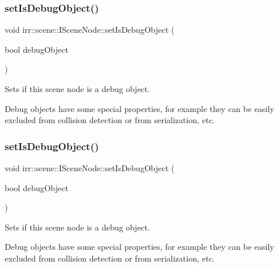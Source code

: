 \subsubsection{\texorpdfstring{set\+Is\+Debug\+Object()}{setIsDebugObject()}\hspace{0.1cm}{\footnotesize\ttfamily [1/2]}}
{\footnotesize\ttfamily void irr\+::scene\+::\+I\+Scene\+Node\+::set\+Is\+Debug\+Object (\begin{DoxyParamCaption}\item[{bool}]{debug\+Object }\end{DoxyParamCaption})\hspace{0.3cm}{\ttfamily [inline]}}



Sets if this scene node is a debug object. 

Debug objects have some special properties, for example they can be easily excluded from collision detection or from serialization, etc. \mbox{\label{classirr_1_1scene_1_1ISceneNode_a7ceda3eb747a353ffeda02c26e697cbd}} 
\subsubsection{\texorpdfstring{set\+Is\+Debug\+Object()}{setIsDebugObject()}\hspace{0.1cm}{\footnotesize\ttfamily [2/2]}}
{\footnotesize\ttfamily void irr\+::scene\+::\+I\+Scene\+Node\+::set\+Is\+Debug\+Object (\begin{DoxyParamCaption}\item[{bool}]{debug\+Object }\end{DoxyParamCaption})\hspace{0.3cm}{\ttfamily [inline]}}



Sets if this scene node is a debug object. 

Debug objects have some special properties, for example they can be easily excluded from collision detection or from serialization, etc. \mbox{\label{classirr_1_1scene_1_1ISceneNode_a2841d5077854b9981711a403f33762cd}} 
